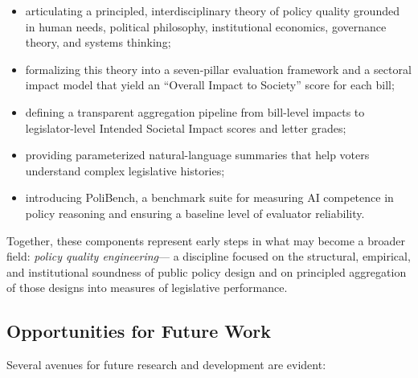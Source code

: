 \documentclass[12pt]{article}
\begin{document}
\begin{itemize}
    \item articulating a principled, interdisciplinary theory of policy quality grounded in human needs, political
    philosophy, institutional economics, governance theory, and systems thinking;
    \item formalizing this theory into a seven-pillar evaluation framework and a sectoral impact model that yield an
    ``Overall Impact to Society'' score for each bill;
    \item defining a transparent aggregation pipeline from bill-level impacts to legislator-level Intended Societal Impact
    scores and letter grades;
    \item providing parameterized natural-language summaries that help voters understand complex legislative histories;
    \item introducing PoliBench, a benchmark suite for measuring AI competence in policy reasoning and ensuring a baseline
    level of evaluator reliability.
\end{itemize}

Together, these components represent early steps in what may become a broader field: \textit{policy quality engineering}---
a discipline focused on the structural, empirical, and institutional soundness of public policy design and on principled
aggregation of those designs into measures of legislative performance.

\subsection{Opportunities for Future Work}

Several avenues for future research and development are evident:
\end{document}
